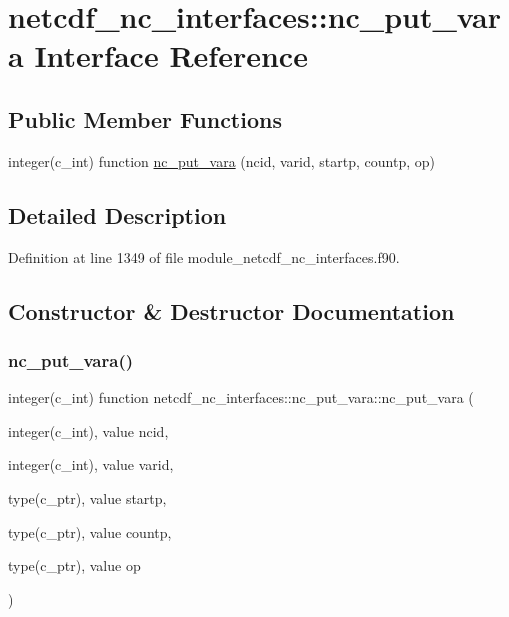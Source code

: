 \hypertarget{interfacenetcdf__nc__interfaces_1_1nc__put__vara}{}\section{netcdf\+\_\+nc\+\_\+interfaces\+:\+:nc\+\_\+put\+\_\+vara Interface Reference}
\label{interfacenetcdf__nc__interfaces_1_1nc__put__vara}
\subsection*{Public Member Functions}
\begin{DoxyCompactItemize}
\item 
integer(c\+\_\+int) function \hyperlink{interfacenetcdf__nc__interfaces_1_1nc__put__vara_ab084ae3ce1a9973ae4b332fe1dfee28c}{nc\+\_\+put\+\_\+vara} (ncid, varid, startp, countp, op)
\end{DoxyCompactItemize}


\subsection{Detailed Description}


Definition at line 1349 of file module\+\_\+netcdf\+\_\+nc\+\_\+interfaces.\+f90.



\subsection{Constructor \& Destructor Documentation}
\mbox{\label{interfacenetcdf__nc__interfaces_1_1nc__put__vara_ab084ae3ce1a9973ae4b332fe1dfee28c}} 
\subsubsection{\texorpdfstring{nc\+\_\+put\+\_\+vara()}{nc\_put\_vara()}}
{\footnotesize\ttfamily integer(c\+\_\+int) function netcdf\+\_\+nc\+\_\+interfaces\+::nc\+\_\+put\+\_\+vara\+::nc\+\_\+put\+\_\+vara (\begin{DoxyParamCaption}\item[{integer(c\+\_\+int), value}]{ncid,  }\item[{integer(c\+\_\+int), value}]{varid,  }\item[{type(c\+\_\+ptr), value}]{startp,  }\item[{type(c\+\_\+ptr), value}]{countp,  }\item[{type(c\+\_\+ptr), value}]{op }\end{DoxyParamCaption})}



